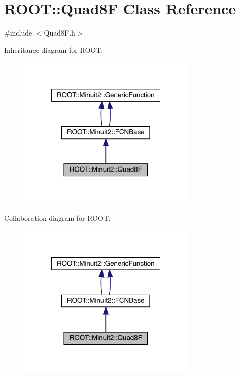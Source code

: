 \hypertarget{classROOT_1_1Minuit2_1_1Quad8F}{}\section{R\+O\+OT\+:\+:Quad8F Class Reference}
\label{classROOT_1_1Minuit2_1_1Quad8F}


{\ttfamily \#include $<$Quad8\+F.\+h$>$}



Inheritance diagram for R\+O\+OT\+:\nopagebreak
\begin{figure}[H]
\begin{center}
\leavevmode
\includegraphics[width=240pt]{d8/dfb/classROOT_1_1Minuit2_1_1Quad8F__inherit__graph}
\end{center}
\end{figure}


Collaboration diagram for R\+O\+OT\+:\nopagebreak
\begin{figure}[H]
\begin{center}
\leavevmode
\includegraphics[width=240pt]{d3/dba/classROOT_1_1Minuit2_1_1Quad8F__coll__graph}
\end{center}
\end{figure}
